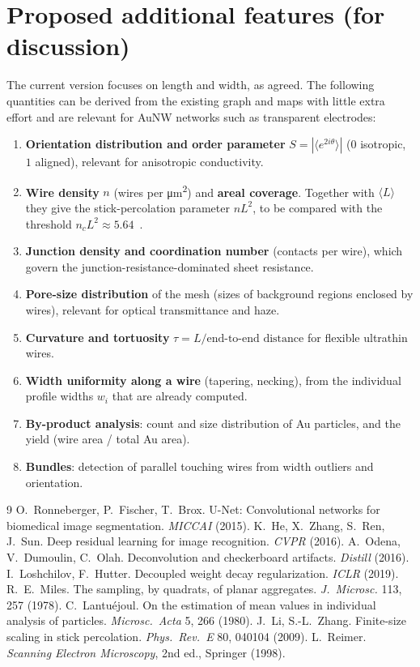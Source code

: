 \documentclass[11pt,a4paper]{article}
\begin{document}
\section{Proposed additional features (for discussion)}
The current version focuses on length and width, as agreed. The following quantities can be derived from the existing graph and maps with little extra effort and are relevant for AuNW networks such as transparent electrodes:
\begin{enumerate}[leftmargin=*,itemsep=1pt]
\item \textbf{Orientation distribution and order parameter} $S=|\langle e^{2i\theta}\rangle|$ ($0$ isotropic, $1$ aligned), relevant for anisotropic conductivity.
\item \textbf{Wire density} $n$ (wires per \si{\micro m^2}) and \textbf{areal coverage}. Together with $\langle L\rangle$ they give the stick-percolation parameter $nL^2$, to be compared with the threshold $n_cL^2\approx5.64$~\cite{li2009}.
\item \textbf{Junction density and coordination number} (contacts per wire), which govern the junction-resistance-dominated sheet resistance.
\item \textbf{Pore-size distribution} of the mesh (sizes of background regions enclosed by wires), relevant for optical transmittance and haze.
\item \textbf{Curvature and tortuosity} $\tau=L/\text{end-to-end distance}$ for flexible ultrathin wires.
\item \textbf{Width uniformity along a wire} (tapering, necking), from the individual profile widths $w_i$ that are already computed.
\item \textbf{By-product analysis}: count and size distribution of Au particles, and the yield (wire area / total Au area).
\item \textbf{Bundles}: detection of parallel touching wires from width outliers and orientation.
\end{enumerate}

\begin{thebibliography}{9}\small
{} O.~Ronneberger, P.~Fischer, T.~Brox. U-Net: Convolutional networks for biomedical image segmentation. \emph{MICCAI} (2015).
 K.~He, X.~Zhang, S.~Ren, J.~Sun. Deep residual learning for image recognition. \emph{CVPR} (2016).
 A.~Odena, V.~Dumoulin, C.~Olah. Deconvolution and checkerboard artifacts. \emph{Distill} (2016).
 I.~Loshchilov, F.~Hutter. Decoupled weight decay regularization. \emph{ICLR} (2019).
 R.~E.~Miles. The sampling, by quadrats, of planar aggregates. \emph{J.~Microsc.} 113, 257 (1978).
 C.~Lantuéjoul. On the estimation of mean values in individual analysis of particles. \emph{Microsc.\ Acta} 5, 266 (1980).
 J.~Li, S.-L.~Zhang. Finite-size scaling in stick percolation. \emph{Phys.\ Rev.\ E} 80, 040104 (2009).
 L.~Reimer. \emph{Scanning Electron Microscopy}, 2nd ed., Springer (1998).
\end{thebibliography}
\end{document}
